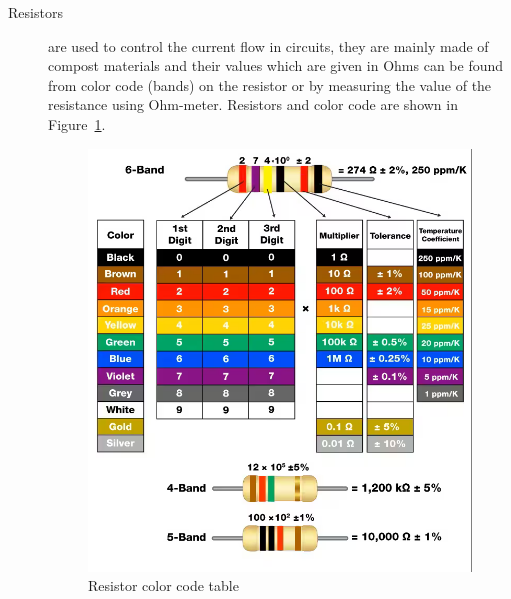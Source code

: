 \documentclass[a4paper, 10pt]{article}
\newcommand{\figref}[1]{Figure~\ref{#1}}
\begin{document}
\begin{description}
				\pagebreak
				\item[Resistors] are used to control the current flow in circuits, they are mainly made of compost materials and their values which are given in Ohms can be found from color code (bands) on the resistor or by measuring the value of the resistance using Ohm-meter.
					Resistors and color code are shown in \figref{fig:ResistorColorCode}.
					\begin{figure}[h!]
						\centering
						\includegraphics[width=\textwidth]{images/ResistorColorCode.png}
						\caption{Resistor color code table}
						\label{fig:ResistorColorCode}
					\end{figure}
			\end{description}
\end{document}
